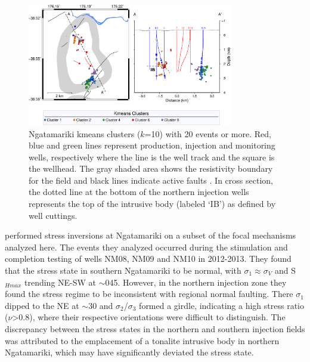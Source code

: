 \begin{figure}
\begin{center}
\includegraphics[width=0.8\textwidth,height=\textheight,keepaspectratio]{Chapter_5_FMs/figures/merc_Nga_GC_kmeans_10_GC_12-2-18/merc_Nga_kmeans_10_GC_12-2-18_intrusive}
\caption[Ngatamariki kmeans clusters]{{
Ngatamariki kmeans clusters ($k$=10) with 20 events or more. Red, blue and green lines represent production, injection and monitoring wells, respectively where the line is the well track and the square is the wellhead. The gray shaded area shows the resistivity boundary for the field \citep{Boseley_2010} and black lines indicate active faults \citep{AFDB}. In cross section, the dotted line at the bottom of the northern injection wells represents the top of the intrusive body (labeled `IB') as defined by well cuttings.
{\label{nga_kmeans}}%
}}
\end{center}
\end{figure}

\citep[][submitted]{j2019} performed stress inversions at Ngatamariki on a subset of the focal mechanisms analyzed here. The events they analyzed occurred during the \gls{stimulation} and completion testing of wells NM08, NM09 and NM10 in 2012-2013. They found that the stress state in southern Ngatamariki to be normal, with $\sigma_{1}\approx{\sigma_{V}}$ and S$_{Hmax}$ trending NE-SW at $\sim$045\textdegree{}. However, in the northern injection zone they found the stress regime to be inconsistent with regional normal faulting. There $\sigma_{1}$ dipped to the NE at $\sim$30\textdegree{} and $\sigma_{2}$\slash{}$\sigma_{3}$ formed a girdle, indicating a high stress ratio ($\nu$\textgreater{0.8}), where their respective orientations were difficult to distinguish. The discrepancy between the stress states in the northern and southern injection fields was attributed to the emplacement of a tonalite intrusive body in northern Ngatamariki, which may have significantly deviated the stress state.

